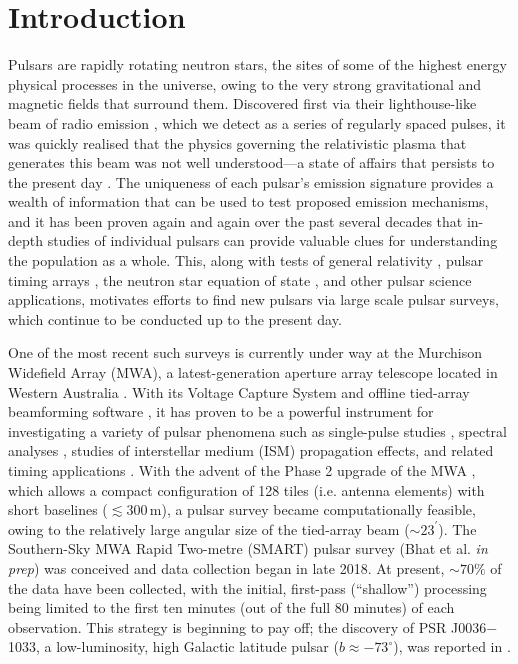 \documentclass[twocolumn]{aastex631}
\newcommand{\psrnick}{J0036$-$1033}
\begin{document}
\section{Introduction} \label{sec:intro}

Pulsars are rapidly rotating neutron stars, the sites of some of the highest energy physical processes in the universe, owing to the very strong gravitational and magnetic fields that surround them.
Discovered first via their lighthouse-like beam of radio emission \citep{Hewish1968}, which we detect as a series of regularly spaced pulses, it was quickly realised that the physics governing the relativistic plasma that generates this beam was not well understood---a state of affairs that persists to the present day \citep[e.g.][]{Melrose2021}.
The uniqueness of each pulsar's emission signature provides a wealth of information that can be used to test proposed emission mechanisms, and it has been proven again and again over the past several decades that in-depth studies of individual pulsars can provide valuable clues for understanding the population as a whole.
This, along with tests of general relativity \citep[e.g.][]{Kramer2006}, pulsar timing arrays \citep[e.g.][]{Manchester2013}, the neutron star equation of state \citep[e.g.][]{Demorest2010}, and other pulsar science applications, motivates efforts to find new pulsars via large scale pulsar surveys, which continue to be conducted up to the present day.

One of the most recent such surveys is currently under way at the Murchison Widefield Array (MWA), a latest-generation aperture array telescope located in Western Australia \citep{Tingay2013}.
With its Voltage Capture System \citep[VCS;][]{Tremblay2015} and offline tied-array beamforming software \citep{Ord2019,McSweeney2020}, it has proven to be a powerful instrument for investigating a variety of pulsar phenomena such as single-pulse studies \citep{McSweeney2017}, spectral analyses \citep{Meyers2017}, studies of interstellar medium (ISM) propagation effects, and related timing applications \citep{Bhat2018,Kaur2019}.
With the advent of the Phase 2 upgrade of the MWA \citep{Wayth2018}, which allows a compact configuration of 128 tiles (i.e. antenna elements) with short baselines ($\lesssim300\,$m), a pulsar survey became computationally feasible, owing to the relatively large angular size of the tied-array beam ($\sim23^\prime$).
The Southern-Sky MWA Rapid Two-metre (SMART) pulsar survey (Bhat et al. \textit{in prep}) was conceived and data collection began in late 2018.
At present, $\sim70\%$ of the data have been collected, with the initial, first-pass (``shallow'') processing being limited to the first ten minutes (out of the full 80 minutes) of each observation.
This strategy is beginning to pay off; the discovery of PSR \psrnick{}, a low-luminosity, high Galactic latitude pulsar ($b \approx -73^{\circ}$), was reported in \citet{Swainston2021}.
\end{document}
